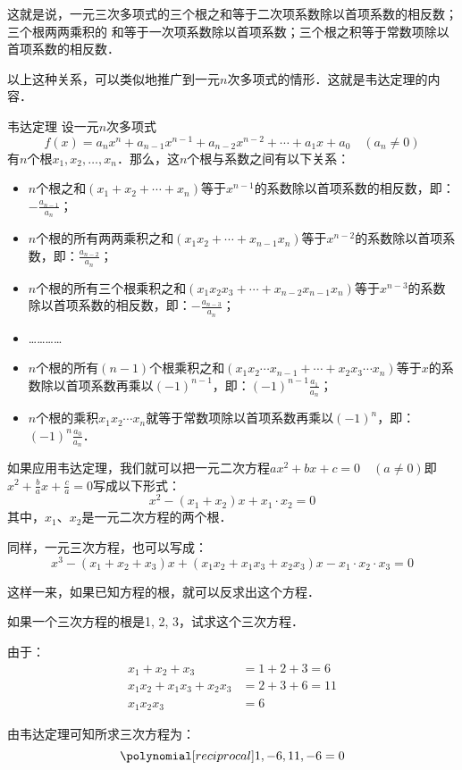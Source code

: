 这就是说，一元三次多项式的三个根之和等于二次项系数除以首项系数的相反数；三个根两两乘积的
和等于一次项系数除以首项系数；三个根之积等于常数项除以首项系数的相反数．

以上这种关系，可以类似地推广到一元$n$次多项式的情形．这就是韦达定理的内容．

\begin{blk}{韦达定理}
设一元$n$次多项式$$f(x)=a_nx^n+a_{n-1}x^{n-1}+a_{n-2}x^{n-2}+\cdots+a_1x+a_0\quad (a_n\ne 0)$$
有$n$个根$x_1,x_2,\ldots,x_n$．那么，这$n$个根与系数之间有以下关系：
\begin{itemize}
    \item $n$个根之和$(x_1+x_2+\cdots+x_n)$等于$x^{n-1}$的系数除以首项系数的相反数，即：$
    -\frac{a_{n-1}}{a_n}$；
    \item $n$个根的所有两两乘积之和$(x_1x_2+\cdots+x_{n-1}x_n)$等于$x^{n-2}$的系数除以首项系数，即：$
    \frac{a_{n-2}}{a_n}$；
    \item $n$个根的所有三个根乘积之和$(x_1x_2x_3+\cdots+x_{n-2}x_{n-1}x_n)$等于$x^{n-3}$的系数除以首项系数的相反数，即：$-\frac{a_{n-3}}{a_n}$；
    \item …………
    \item $n$个根的所有$(n-1)$个根乘积之和$(x_1x_2\cdots x_{n-1} +\cdots+ x_2x_3\cdots x_n)$等于$x$的系数除以首项系数再乘以$(-1)^{n-1}$，即：$ (-1)^{n-1}\frac{a_{1}}{a_n}$；
    \item $n$个根的乘积$x_1x_2\cdots x_n$就等于常数项除以首项系数再乘以$(-1)^{n}$，即：$ (-1)^{n}\frac{a_{0}}{a_n}$．
\end{itemize}
\end{blk}

如果应用韦达定理，我们就可以把一元二次方程$ax^2+bx+c=0\quad (a\ne 0)$即 $x^2+\frac{b}{a}x+\frac{c}{a}=0$写成以下形式：
\[x^2- (x_1+x_2) x+x_1\cdot x_2=0\]
其中，$x_1$、$x_2$是一元二次方程的两个根．

同样，一元三次方程，也可以写成：
\[x^3- (x_1+x_2+x_3) x+ (x_1x_2+x_1x_3+x_2x_3) x
-x_1\cdot x_2\cdot x_3=0\]

这样一来，如果已知方程的根，就可以反求出这个方程．

\begin{example}
    如果一个三次方程的根是1, 2, 3，试求这个三次方程．
\end{example}

\begin{solution}
由于：\[\begin{split}
    x_1+x_2+x_3 &=1+2+3=6\\
    x_1x_2+x_1x_3+x_2x_3&=2+3+6=11\\
    x_1x_2x_3&=6
\end{split}\]

由韦达定理可知所求三次方程为：
\[\poly{1,-6,11,-6}=0\]
\end{solution}

